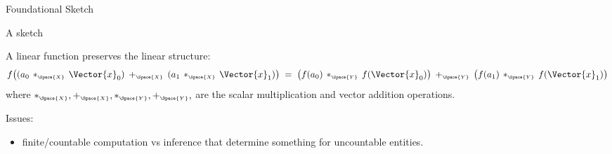 \begin{plSection}{Foundational Sketch}
\begin{plSection}{A sketch}
\begin{description}
A linear function preserves the linear structure:
\begin{equation*}
f \big( (a_0 \, *_{\scriptscriptstyle\Space{X}} \, \Vector{x}_0) 
\: +_{\scriptscriptstyle\Space{X}} \: 
(a_1 \, *_{\scriptscriptstyle\Space{X}} \, \Vector{x}_1) \big)
\; = \; 
\big( f(a_0) \, *_{\scriptscriptstyle\Space{Y}} \, f(\Vector{x}_0) \big) 
\: +_{\scriptscriptstyle\Space{Y}} \: 
\big( f(a_1) \, *_{\scriptscriptstyle\Space{Y}} \, f(\Vector{x}_1) \big)
\end{equation*}
where $*_{\scriptscriptstyle\Space{X}}, +_{\scriptscriptstyle\Space{X}}, 
*_{\scriptscriptstyle\Space{Y}}, +_{\scriptscriptstyle\Space{Y}},$
are the scalar multiplication and vector addition operations.
\end{description}

Issues: 
\begin{itemize}
  \item finite/countable computation vs inference that determine
something for uncountable entities.
  \end{itemize}

\end{plSection}%
\end{plSection}%
